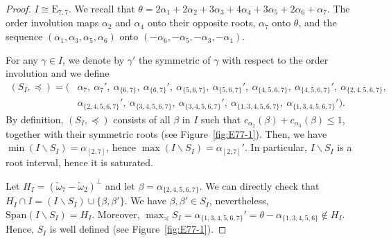 \documentclass[ALCO,published]{cedram}
\theoremstyle{plain}
\newcommand\nl{\par\noindent}
\newcommand\smeno{\smallsetminus}
\newcommand\gen{\mathrm{Span}}
\newcommand\al{\alpha}
\newcommand\be{\beta}
\newcommand\ga{\gamma}
\newcommand\preq{\preccurlyeq}
\renewcommand{\leq}{\leqslant}
\begin{document}
\begin{proof}
\bigskip

\nl {\bf E7.} $I\cong \mathrm E_{7, 7}$. 
We recall that $\theta=2\al_1+2\al_2+3\al_3+4\al_4+3\al_5+2\al_6+\al_7$. 
The order involution maps $\al_2$ and $\al_4$ onto their opposite roots, $\al_7$ onto $\theta$, and the sequence $(\al_1, \al_3,\al_5, \al_6)$ onto $(-\al_6, -\al_5, -\al_3, -\al_1)$.
\par
For any $\ga\in I$, we denote by $\ga'$ the symmetric of $\ga$ with respect to the order involution and we define
\begin{align*}
(S_I, \preq)=
(&\al_7,\: \al_7',\: 
\al_{\{6, 7\}},\ \al_{\{6, 7\}}',\ 
\al_{\{5, 6,7\}},\ \al_{\{5, 6,7\}}',\ 
\al_{\{4, 5, 6,7\}},\ \al_{\{4, 5, 6,7\}}',\ 
\al_{\{2, 4, 5, 6,7\}},\\
&\al_{\{2, 4, 5, 6,7\}}',\ 
\al_{\{3, 4, 5, 6,7\}},\ \al_{\{3, 4, 5, 6,7\}}',\ 
\al_{\{1, 3, 4, 5, 6,7\}},\ \al_{\{1, 3, 4, 5, 6,7\}}').
\end{align*}
By definition, $(S_I,\preq)$ consists of all $\be$ in $I$ such that $c_{\al_2}(\be)+c_{\al_3}(\be)\leq 1$, together with their symmetric roots  (see Figure~\ref{fig:E77-1}).
Then, we have $\min(I\smeno S_I)=\al_{[2,7]}$, hence $\max(I\smeno S_I)=\al_{[2,7]}'$. 
In particular,  $I\smeno S_I$ is a root interval, hence it is saturated.

\par
Let $H_I=(\check\omega_7-\check\omega_2)^\perp$ and let $\be=\al_{\{2, 4, 5, 6,7\}}$. 
We can directly check that $H_I\cap I=(I\smeno S_I)\cup \{\be, \be'\}$. 
We have $\be, \be'\in S_I$, nevertheless, $\gen(I\smeno S_I)=H_I$.
Moreover, $\max_\preq S_I=\al_{\{1, 3, 4, 5, 6,7\}}'=\theta-\al_{\{1, 3, 4, 5, 6\}}\not\in H_I$. 
Hence, $S_I$ is well defined (see Figure~\ref{fig:E77-1}).


\end{proof}
\end{document}
